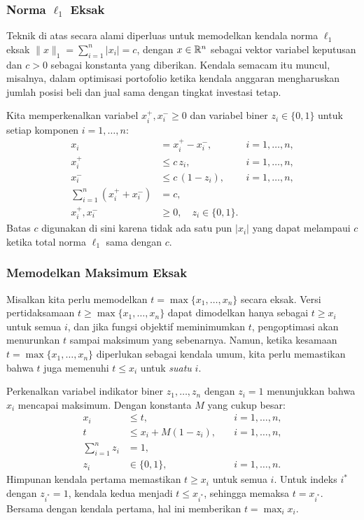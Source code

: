 \subsubsection{Norma $\ell_1$ Eksak}
Teknik di atas secara alami diperluas untuk memodelkan kendala norma $\ell_1$ eksak
$\|x\|_1 = \sum_{i=1}^{n} |x_i| = c$,
dengan $x \in {\mathbb{R}}^n$ sebagai vektor variabel keputusan dan $c > 0$ sebagai konstanta yang diberikan.
Kendala semacam itu muncul, misalnya, dalam optimisasi portofolio ketika kendala anggaran mengharuskan jumlah posisi beli dan jual sama dengan tingkat investasi tetap.

Kita memperkenalkan variabel $x_i^+, x_i^- \geq 0$ dan variabel biner $z_i \in \{0,1\}$ untuk setiap komponen $i = 1, \ldots, n$:
\begin{align*}
x_i &= x_i^+ - x_i^-, \quad &i = 1, \ldots, n,\\
x_i^+ &\leq c\, z_i, \quad &i = 1, \ldots, n,\\
x_i^- &\leq c\,(1 - z_i), \quad &i = 1, \ldots, n,\\
\sum_{i=1}^n (x_i^+ + x_i^-) &= c,\\
x_i^+, x_i^- &\geq 0, \quad z_i \in \{0,1\}.
\end{align*}
Batas $c$ digunakan di sini karena tidak ada satu pun $|x_i|$ yang dapat melampaui $c$ ketika total norma $\ell_1$ sama dengan $c$.

\subsubsection{Memodelkan Maksimum Eksak}
Misalkan kita perlu memodelkan $t = \max\{x_1, \ldots, x_n\}$ secara eksak.
Versi pertidaksamaan $t \geq \max\{x_1, \ldots, x_n\}$ dapat dimodelkan hanya sebagai $t \geq x_i$ untuk semua $i$, dan jika fungsi objektif meminimumkan $t$, pengoptimasi akan menurunkan $t$ sampai maksimum yang sebenarnya.
Namun, ketika kesamaan $t = \max\{x_1, \ldots, x_n\}$ diperlukan sebagai kendala umum, kita perlu memastikan bahwa $t$ juga memenuhi $t \leq x_i$ untuk \emph{suatu} $i$.

Perkenalkan variabel indikator biner $z_1, \ldots, z_n$ dengan $z_i = 1$ menunjukkan bahwa $x_i$ mencapai maksimum.
Dengan konstanta $M$ yang cukup besar:
\begin{align*}
x_i &\leq t, \quad &i = 1, \ldots, n, \\
t &\leq x_i + M(1 - z_i), \quad &i = 1, \ldots, n, \\
\sum_{i=1}^n z_i &= 1,\\
z_i &\in \{0,1\}, \quad &i = 1, \ldots, n.
\end{align*}
Himpunan kendala pertama memastikan $t \geq x_i$ untuk semua $i$.
Untuk indeks $i^*$ dengan $z_{i^*} = 1$, kendala kedua menjadi $t \leq x_{i^*}$, sehingga memaksa $t = x_{i^*}$.
Bersama dengan kendala pertama, hal ini memberikan $t = \max_i x_i$.

